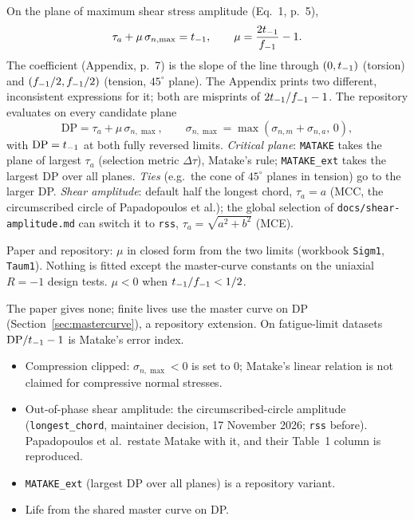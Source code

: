  On the plane of maximum shear stress amplitude (Eq.~1, p.~5),
\begin{equation}
\tau_a + \mu\,\sigma_{n,\max} = t_{-1} ,\qquad \mu = \frac{2t_{-1}}{f_{-1}} - 1 .
\label{eq:mtk-mu}
\end{equation}
The coefficient (Appendix, p.~7) is the slope of the line through $(0,t_{-1})$ (torsion) and
$(f_{-1}/2,f_{-1}/2)$ (tension, $45^\circ$ plane). The Appendix prints two different, inconsistent
expressions for it; both are misprints of $2t_{-1}/f_{-1}-1$. The repository evaluates on every candidate
plane
\begin{equation}
\mathrm{DP} = \tau_a + \mu\,\sigma_{n,\max},\qquad \sigma_{n,\max}=\max(\sigma_{n,m}+\sigma_{n,a},\,0),
\label{eq:mtk-dp}
\end{equation}
with $\mathrm{DP}=t_{-1}$ at both fully reversed limits. \emph{Critical plane}: \texttt{MATAKE} takes
the plane of largest $\tau_a$ (selection metric $\Delta\tau$), Matake's rule; \texttt{MATAKE\_ext}
takes the largest DP over all planes. \emph{Ties} (e.g.\ the cone of $45^\circ$ planes in tension) go
to the larger DP. \emph{Shear amplitude}: default half the longest chord, $\tau_a=a$ (MCC, the circumscribed circle
of Papadopoulos et al.); the global selection of \texttt{docs/shear-amplitude.md} can switch it to
\texttt{rss}, $\tau_a=\sqrt{a^2+b^2}$ (MCE).

 Paper and repository: $\mu$ in closed form from the two limits
(workbook \texttt{Sigm1}, \texttt{Taum1}). Nothing is fitted except the master-curve constants on the
uniaxial $R=-1$ design tests. $\mu<0$ when $t_{-1}/f_{-1}<1/2$.

 The paper gives none; finite lives use the master curve on DP
(Section~\ref{sec:mastercurve}), a repository extension. On fatigue-limit datasets
$\mathrm{DP}/t_{-1}-1$ is Matake's error index.

\begin{itemize}
\item Compression clipped: $\sigma_{n,\max}<0$ is set to 0; Matake's linear relation is not claimed for
  compressive normal stresses.
\item Out-of-phase shear amplitude: the circumscribed-circle amplitude (\texttt{longest\_chord},
  maintainer decision, 17 November 2026; \texttt{rss} before). Papadopoulos et al.\ restate Matake
  with it, and their Table~1 column is
  reproduced.
\item \texttt{MATAKE\_ext} (largest DP over all planes) is a repository variant.
\item Life from the shared master curve on DP.
\end{itemize}

